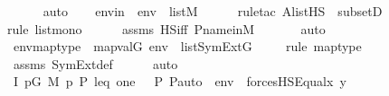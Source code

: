\begin{isabellebody}
\ \ \ \ \isamarkupfalse%
\ auto\isanewline
\isanewline
\ \ \isamarkupfalse%
\ envin\ {\isacharcolon}{\kern0pt}\ {\isachardoublequoteopen}env\ {\isasymin}\ list{\isacharparenleft}{\kern0pt}M{\isacharparenright}{\kern0pt}{\isachardoublequoteclose}\ \isanewline
\ \ \ \ \isamarkupfalse%
{\isacharparenleft}{\kern0pt}rule{\isacharunderscore}{\kern0pt}tac\ A{\isacharequal}{\kern0pt}{\isachardoublequoteopen}list{\isacharparenleft}{\kern0pt}HS{\isacharparenright}{\kern0pt}{\isachardoublequoteclose}\ \ subsetD{\isacharparenright}{\kern0pt}\isanewline
\ \ \ \ \ \isamarkupfalse%
{\isacharparenleft}{\kern0pt}rule\ list{\isacharunderscore}{\kern0pt}mono{\isacharparenright}{\kern0pt}\isanewline
\ \ \ \ \isamarkupfalse%
\ assms{}\ HS{\isacharunderscore}{\kern0pt}iff\ P{\isacharunderscore}{\kern0pt}name{\isacharunderscore}{\kern0pt}in{\isacharunderscore}{\kern0pt}M\ \isanewline
\ \ \ \ \isamarkupfalse%
\ auto\isanewline
\isanewline
\ \ \isamarkupfalse%
\ envmaptype\ {\isacharcolon}{\kern0pt}\ {\isachardoublequoteopen}map{\isacharparenleft}{\kern0pt}val{\isacharparenleft}{\kern0pt}G{\isacharparenright}{\kern0pt}{\isacharcomma}{\kern0pt}\ env{\isacharparenright}{\kern0pt}\ {\isasymin}\ list{\isacharparenleft}{\kern0pt}SymExt{\isacharparenleft}{\kern0pt}G{\isacharparenright}{\kern0pt}{\isacharparenright}{\kern0pt}{\isachardoublequoteclose}\isanewline
\ \ \ \ \isamarkupfalse%
{\isacharparenleft}{\kern0pt}rule\ map{\isacharunderscore}{\kern0pt}type{\isacharparenright}{\kern0pt}\isanewline
\ \ \ \ \isamarkupfalse%
\ assms{}\ SymExt{\isacharunderscore}{\kern0pt}def\isanewline
\ \ \ \ \isamarkupfalse%
\ auto\isanewline
\isanewline
\ \ \isamarkupfalse%
\ I{}{\isacharcolon}{\kern0pt}\ {\isachardoublequoteopen}{\isacharparenleft}{\kern0pt}{\isasymexists}p{\isasymin}G{\isachardot}{\kern0pt}\ M{\isacharcomma}{\kern0pt}\ {\isacharbrackleft}{\kern0pt}p{\isacharcomma}{\kern0pt}\ P{\isacharcomma}{\kern0pt}\ leq{\isacharcomma}{\kern0pt}\ one{\isacharcomma}{\kern0pt}\ {\isasymlangle}{\isasymF}{\isacharcomma}{\kern0pt}\ {\isasymG}{\isacharcomma}{\kern0pt}\ P{\isacharcomma}{\kern0pt}\ P{\isacharunderscore}{\kern0pt}auto{\isasymrangle}{\isacharbrackright}{\kern0pt}\ {\isacharat}{\kern0pt}\ env\ {\isasymTurnstile}\ forcesHS{\isacharparenleft}{\kern0pt}Equal{\isacharparenleft}{\kern0pt}x{\isacharcomma}{\kern0pt}\ y{\isacharparenright}{\kern0pt}{\isacharparenright}{\kern0pt}{\isacharparenright}{\kern0pt}\ {\isasymlongleftrightarrow}\ \isanewline

\end{isabellebody}
